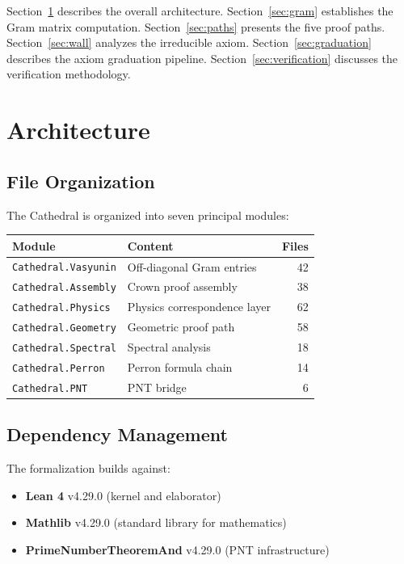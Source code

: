 \documentclass[11pt,a4paper]{article}
\theoremstyle{definition}
\newcommand{\lean}[1]{\texttt{#1}}
\begin{document}
Section~\ref{sec:architecture} describes the overall architecture.
Section~\ref{sec:gram} establishes the Gram matrix computation.
Section~\ref{sec:paths} presents the five proof paths.
Section~\ref{sec:wall} analyzes the irreducible axiom.
Section~\ref{sec:graduation} describes the axiom graduation pipeline.
Section~\ref{sec:verification} discusses the verification methodology.

\section{Architecture}
\label{sec:architecture}

\subsection{File Organization}

The Cathedral is organized into seven principal modules:

\begin{center}
\begin{tabular}{@{}llr@{}}
\toprule
\textbf{Module} & \textbf{Content} & \textbf{Files} \\
\midrule
\lean{Cathedral.Vasyunin} & Off-diagonal Gram entries & 42 \\
\lean{Cathedral.Assembly} & Crown proof assembly & 38 \\
\lean{Cathedral.Physics}  & Physics correspondence layer & 62 \\
\lean{Cathedral.Geometry} & Geometric proof path & 58 \\
\lean{Cathedral.Spectral} & Spectral analysis & 18 \\
\lean{Cathedral.Perron}   & Perron formula chain & 14 \\
\lean{Cathedral.PNT}      & PNT bridge & 6 \\
\bottomrule
\end{tabular}
\end{center}

\subsection{Dependency Management}

The formalization builds against:
\begin{itemize}
  \item \textbf{Lean 4} v4.29.0 (kernel and elaborator)
  \item \textbf{Mathlib} v4.29.0 (standard library for mathematics)
  \item \textbf{PrimeNumberTheoremAnd} v4.29.0 (PNT infrastructure)
\end{itemize}
\end{document}
